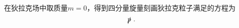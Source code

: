 
\begin{issues}
\issueDraft
\end{issues}

在狄拉克场中取质量$m=0$，得到四分量旋量刻画狄拉克粒子满足的方程为
\begin{equation}
\slashed{p}~.
\end{equation}
